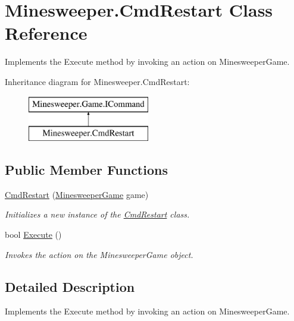 \hypertarget{class_minesweeper_1_1_cmd_restart}{\section{Minesweeper.\+Cmd\+Restart Class Reference}
\label{class_minesweeper_1_1_cmd_restart}
}


Implements the Execute method by invoking an action on Minesweeper\+Game.  


Inheritance diagram for Minesweeper.\+Cmd\+Restart\+:\begin{figure}[H]
\begin{center}
\leavevmode
\includegraphics[height=2.000000cm]{class_minesweeper_1_1_cmd_restart}
\end{center}
\end{figure}
\subsection*{Public Member Functions}
\begin{DoxyCompactItemize}
\item 
\hyperlink{class_minesweeper_1_1_cmd_restart_ae20b917dc9b12aafac0e5e5ed5a1a7cc}{Cmd\+Restart} (\hyperlink{class_minesweeper_1_1_game_1_1_minesweeper_game}{Minesweeper\+Game} game)
\begin{DoxyCompactList}\small\item\em Initializes a new instance of the \hyperlink{class_minesweeper_1_1_cmd_restart}{Cmd\+Restart} class. \end{DoxyCompactList}\item 
bool \hyperlink{class_minesweeper_1_1_cmd_restart_a58ff1eea35e4a710c840eedcd421122f}{Execute} ()
\begin{DoxyCompactList}\small\item\em Invokes the action on the Minesweeper\+Game object. \end{DoxyCompactList}\end{DoxyCompactItemize}


\subsection{Detailed Description}
Implements the Execute method by invoking an action on Minesweeper\+Game. 




